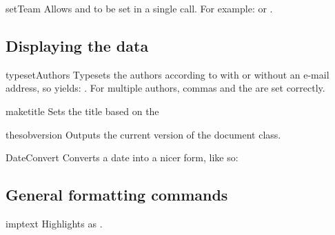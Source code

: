 \documentclass{sopra-base}
\begin{document}
\begin{command}{setTeam}{}
    Allows  and  to be set in a single call.
    For example:  or
    .
\end{command}

\subsection{Displaying the data}

\begin{command}{typesetAuthors}{}
    Typesets the authors according to  with or
    without an e-mail address, so  yields: \typesetAuthors.
    For multiple authors, commas and the  are set correctly.
\end{command}

\begin{command}{maketitle}{}
    Sets the title based on the 
\end{command}

\begin{command}{thesobversion}{}
    Outputs the current version of the  document class. 
\end{command}

\begin{command}{DateConvert}{}
    Converts a date into a nicer form, like so:
\begin{plainlatex}[morekeywords={[5]{\\DateConvert}}]
\end{plainlatex}
\end{command}

\subsection{General formatting commands}

\begin{command}{imptext}{}
    Highlights  as .
\end{command}
\end{document}

